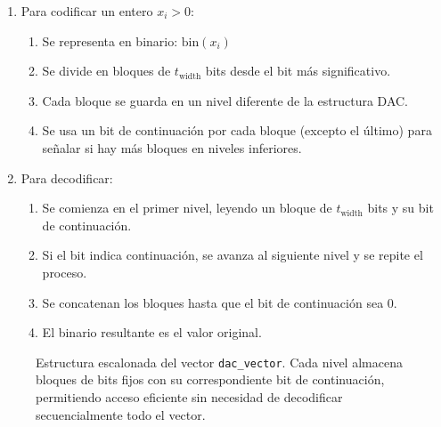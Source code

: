 \begin{enumerate}
        \begin{enumerate}
            \item Para codificar un entero \(x_i > 0\):
            \begin{enumerate}
                \item Se representa en binario: \(\text{bin}(x_i)\)
                \item Se divide en bloques de \(t_{\text{width}}\) bits desde el bit más significativo.
                \item Cada bloque se guarda en un nivel diferente de la estructura DAC.
                \item Se usa un bit de continuación por cada bloque (excepto el último) para señalar si hay más bloques en niveles inferiores.
            \end{enumerate}
    
            \item Para decodificar:
            \begin{enumerate}
                \item Se comienza en el primer nivel, leyendo un bloque de \(t_{\text{width}}\) bits y su bit de continuación.
                \item Si el bit indica continuación, se avanza al siguiente nivel y se repite el proceso.
                \item Se concatenan los bloques hasta que el bit de continuación sea 0.
                \item El binario resultante es el valor original.
            \end{enumerate}
        \end{enumerate}
        
        \begin{figure}
            \centering
            \caption[Ejemplo \texttt{dac\_vector}]{Estructura escalonada del vector \texttt{dac\_vector}. Cada nivel almacena bloques de bits fijos con su correspondiente bit de continuación, permitiendo acceso eficiente sin necesidad de decodificar secuencialmente todo el vector.}
            \label{dac_vector}
        \end{figure}


\end{enumerate}

